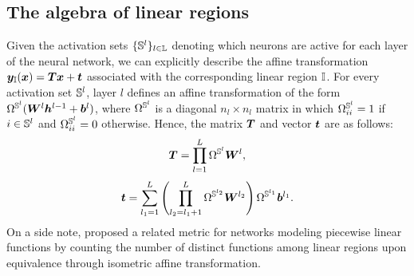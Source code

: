 \subsection{The algebra of linear regions}
\label{sec:algebraoflinearegions}

Given the activation sets $\{ {\mathbb{S}}^l \}_{l \in {\mathbb{L}}}$ denoting which neurons are active for each layer of the neural network, 
we can explicitly describe the affine transformation ${\bm{y}}_{\mathbb{I}}({\bm{x}}) = {\bm{T}} {\bm{x}} + {\bm{t}}$ associated with the corresponding linear region ${\mathbb{I}}$. 
For every activation set ${\mathbb{S}}^l$, layer $l$ defines an affine transformation of the form $\Omega^{{\mathbb{S}}^l}({\bm{W}}^l {\bm{h}}^{l-1} + {\bm{b}}^l)$, where $\Omega^{{\mathbb{S}}^l}$ is a diagonal $n_l \times n_l$ matrix in which $\Omega^{{\mathbb{S}}^l}_{ii} = 1$ if $i \in {\mathbb{S}}^l$ and $\Omega^{{\mathbb{S}}^l}_{ii} = 0$ otherwise. 
Hence, the matrix ${\bm{T}}$ and vector ${\bm{t}}$ are as follows:
\[
{\bm{T}} = \prod_{l=1}^L \Omega^{{\mathbb{S}}^l} {\bm{W}}^{l},
\]
\[
{\bm{t}} = \sum_{l_1=1}^{L} \left( \prod_{l_2=l_1+1}^{L} \Omega^{{\mathbb{S}}^{l_2}} {\bm{W}}^{l_2} \right) \Omega^{{\mathbb{S}}^{l_1}} {\bm{b}}^{l_1}.
\]
On a side note, 
\cite{takai2021functions} proposed a related metric for networks modeling piecewise linear functions by counting the number of distinct functions among linear regions upon equivalence through isometric affine transformation.


